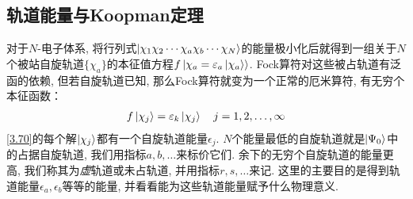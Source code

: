 \subsection{轨道能量与Koopman定理}
对于$N$-电子体系, 将行列式$\Ket{\chi_1\chi_2\cdots\chi_a\chi_b\cdots\chi_N}$的能量极小化后就得到一组关于$N$个被站自旋轨道$\{\chi_a\}$的本征值方程$f\Ket{\chi_a = \varepsilon_a\Ket{\chi_a}}$. Fock算符对这些被占轨道有泛函的依赖, 但若自旋轨道已知, 那么Fock算符就变为一个正常的厄米算符, 有无穷个本征函数：
\begin{align}
\label{3.70}
f\Ket{\chi_j} = \varepsilon_k\Ket{\chi_j}\quad j = 1,2,\ldots,\infty
\end{align}
\eqref{3.70}的每个解$\Ket{\chi_j}$都有一个自旋轨道能量$\epsilon_j$. $N$个能量最低的自旋轨道就是$\Ket{\Psi_0}$中的占据自旋轨道, 我们用指标$a,b,\ldots$来标价它们. 余下的无穷个自旋轨道的能量更高, 我们称其为\emph{虚}轨道或未占轨道, 并用指标$r,s,\ldots$来记. 这里的主要目的是得到轨道能量$\epsilon_a,\epsilon_b$等等的能量, 并看看能为这些轨道能量赋予什么物理意义.

